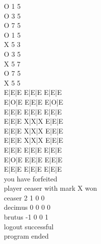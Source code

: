 \documentclass[]{article}
\begin{document}
{O 1 5\\
O 3 5\\
O 7 5\\
O 1 5\\
X 5 3\\
O 3 5\\
X 5 7\\
O 7 5\\
X 5 5\\
E|E|E E|E|E E|E|E\\ 
E|O|E E|E|E E|O|E\\ 
E|E|E E|E|E E|E|E\\
E|E|E X|X|X E|E|E\\ 
E|E|E X|X|X E|E|E\\ 
E|E|E X|X|X E|E|E\\
E|E|E E|E|E E|E|E\\ 
E|O|E E|E|E E|E|E\\ 
E|E|E E|E|E E|E|E\\
you have forfeited\\
player ceaser with mark X won\\
ceaser 2 1 0 0\\
decimus 0 0 0 0\\
brutus -1 0 0 1\\
logout successful\\
program ended 	
}

\newpage
\end{document}
